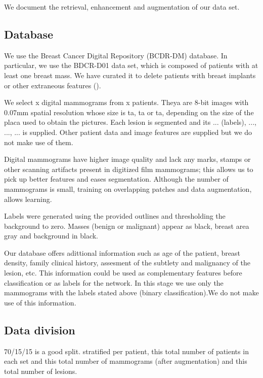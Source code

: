 We document the retrieval, enhancement and augmentation of our data set.

\subsection{Database}
We use the Breast Cancer Digital Repository (BCDR-DM) database. In particular, we use the BDCR-D01 data set, which is composed of patients with at least one breast mass. We have curated it to delete patients with breast implants or other extraneous features ().

We select x digital mammograms from x patients. Theya are 8-bit images with 0.07mm spatial resolution whose size is ta, ta or ta, depending on the size of the placa used to obtain the pictures. Each lesion is segmented and its ... (labels), ..., ..., ... is supplied. Other patient data and image features are supplied but we do not make use of them.

Digital mammograms have higher image quality and lack any marks, stamps or other scanning artifacts present in digitized film mammograms; this allows us to pick up better features and eases segmentation. Although the number of mammograms is small, training on overlapping patches and data augmentation, allows learning.

Labels were generated using the provided outlines and thresholding the background to zero. Masses (benign or malignant) appear as black, breast area gray and background in black.

Our database offers adittional information such as age of the patient, breast density, family clinical history, assesment of the subtlety and malignancy of the lesion, etc. This information could be used as complementary features before classification or as labels for the network. In this stage we use only the mammograms with the labels stated above (binary classification).We do not make use of this information.


\subsection{Data division}
70/15/15 is a good split. stratified per patient, this total number of patients in each set and this total number of mammograms (after augmentation) and this total number of lesions.

